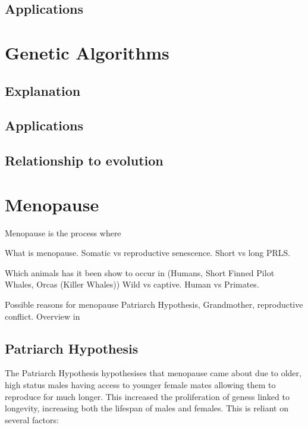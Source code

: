 \documentclass[authoryearcitations]{UoYCSproject}
\begin{document}
\subsection{Applications}

\section{Genetic Algorithms}

\subsection{Explanation}

\subsection{Applications}

\subsection{Relationship to evolution}

\newpage
\section{Menopause}
Menopause is the process where 

What is menopause. Somatic vs reproductive senescence. Short vs long PRLS.

Which animals has it been show to occur in (Humans, Short Finned Pilot Whales, Orcas (Killer Whales)) Wild vs captive. Human vs Primates.

Possible reasons for menopause Patriarch Hypothesis, Grandmother, reproductive conflict. Overview in \cite{evolutionPRLS2015}

\subsection{Patriarch Hypothesis}
The Patriarch Hypothesis \cite{patriarchHypothesis2000} hypothesises that menopause came about due to older, high status males having access to younger female mates allowing them to reproduce for much longer. This increased the proliferation of geness linked to longevity, increasing both the lifespan of males and females. This is reliant on several factors: 
\end{document}
